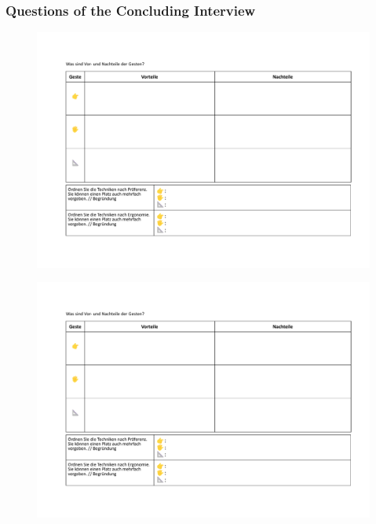 \subsubsection{Questions of the Concluding Interview}
\begin{figure}[!h]
\centering
\includegraphics[page=1,width=\textwidth]{figures/Appendix/interview.pdf}
\end{figure}
\begin{figure}[!h]
\centering
\includegraphics[page=2,width=\textwidth]{figures/Appendix/interview.pdf}
\end{figure}
